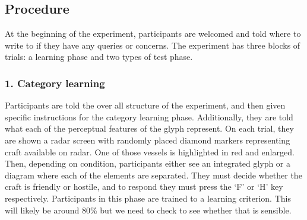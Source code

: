 \documentclass[doc, a4paper, apacite]{apa6}
\begin{document}
\subsection{Procedure}
At the beginning of the experiment, participants are welcomed and told where to write to if they have any queries or concerns. 
The experiment has three blocks of trials: a learning phase and two types of test phase. 

\subsubsection{1. Category learning} 
Participants are told the over all structure of the experiment, and then given specific instructions for the category learning phase. 
Additionally, they are told what each of the perceptual features of the glyph represent. 
On each trial, they are shown a radar screen with randomly placed diamond markers representing craft available on radar. 
One of those vessels is highlighted in red and enlarged. 
Then, depending on condition, participants either see an integrated glyph or a diagram where each of the elements are separated. 
They must decide whether the craft is friendly or hostile, and to respond they must press the `F' or `H' key respectively. 
Participants in this phase are trained to a learning criterion. 
This will likely be around 80\% but we need to check to see whether that is sensible. 





\clearpage
\newpage


\end{document}

